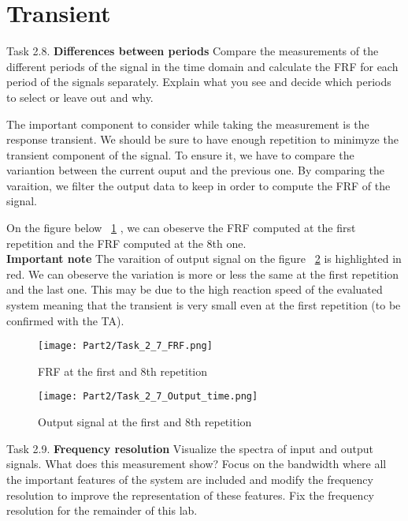 \section{Transient}

\begin{Task}{Task 2.8.}
    \textbf{Differences between periods} Compare the measurements of the
    different periods of the signal in the time domain and calculate the FRF for each
    period of the signals separately. Explain what you see and decide which periods to
    select or leave out and why.
\end{Task}

The important component to consider while taking the measurement is the response transient.  We should be sure to have enough repetition to 
minimyze the transient component of the signal.  To ensure it, we have to compare the variantion between the current ouput and the previous one.
By comparing the varaition, we filter the output data to keep in order to compute the FRF of the signal.

On the figure below ~\ref{FRF} , we can obeserve the FRF computed at the first repetition and the FRF computed at the 8th one. \\
\textbf{Important note} The varaition of output signal on the figure ~\ref{Time signal response} is highlighted in red.  We can obeserve the variation is more or less the same at
the first repetition and the last one. This may be due to the high reaction speed of the evaluated system meaning that the transient is very small even at the first repetition
 (to be confirmed with the TA).

\begin{figure}[H]
    \centering
    \texttt{[image: Part2/Task\_2\_7\_FRF.png]}
    \caption{FRF at the first and 8th repetition}
    \label{FRF}
\end{figure}

\begin{figure}[H]
    \centering
    \texttt{[image: Part2/Task\_2\_7\_Output\_time.png]}
    \caption{Output signal at the first and 8th repetition}
    \label{Time signal response}
\end{figure}

\begin{Task}{Task 2.9.}
    \textbf{Frequency resolution} Visualize the spectra of input and output
    signals. What does this measurement show? Focus on the bandwidth where all the
    important features of the system are included and modify the frequency resolution
    to improve the representation of these features. Fix the frequency resolution for the
    remainder of this lab.
\end{Task}

